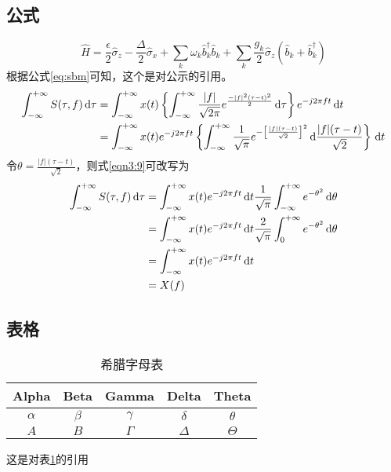 \subsection{公式}
\begin{equation}
\hat{H}=\frac{\epsilon}{2}\hat{\sigma}_{z}-\frac{\Delta}{2}\hat{\sigma}_{x}+\sum_{k}\omega_{k}\hat{b}_{k}^{\dagger}\hat{b}_{k}+\sum_{k}\frac{g_{k}}{2}\hat{\sigma}_{z}(\hat{b}_{k}+\hat{b}_{k}^{\dagger})\label{eq:sbm}
\end{equation}
根据公式\ref{eq:sbm}可知，这个是对公示的引用。
\begin{align}\label{eqn3:9}
\int_{-\infty}^{+\infty}S(\tau,f)\,\mathrm{d}\tau&=\int_{-\infty}^{+\infty}x(t)\left\{\int_{-\infty}^{+\infty}\frac{|f|}{\sqrt{2\pi}}e^{\frac{-|f|^2(\tau-t)^2}{2}}\,\mathrm{d}\tau\right\}e^{-j2\pi ft}\,\mathrm{d}t\notag\\
&=\int_{-\infty}^{+\infty}x(t)e^{-j2\pi ft}\left\{\int_{-\infty}^{+\infty}\frac{1}{\sqrt{\pi}}e^{-\left[\frac{|f|(\tau-t)}{\sqrt{2}}\right]^2}\,\mathrm{d}\frac{|f|(\tau-t)}{\sqrt{2}}\right\}\,\mathrm{d}t
\end{align}
令$\theta=\frac{|f|(\tau-t)}{\sqrt{2}}$，则式\eqref{eqn3:9}可改写为
\begin{align}\label{eqn3:10}
\int_{-\infty}^{+\infty}S(\tau,f)\,\mathrm{d}\tau&=\int_{-\infty}^{+\infty}x(t)e^{-j2\pi ft}\,\mathrm{d}t\frac{1}{\sqrt{\pi}}\int_{-\infty}^{+\infty}e^{-\theta^2}\,\mathrm{d}\theta\notag\\
&=\int_{-\infty}^{+\infty}x(t)e^{-j2\pi ft}\,\mathrm{d}t\frac{2}{\sqrt{\pi}}\int_{0}^{+\infty}e^{-\theta^2}\,\mathrm{d}\theta\notag\\
&=\int_{-\infty}^{+\infty}x(t)e^{-j2\pi ft}\,\mathrm{d}t\notag\\
&=X(f)
\end{align}
\subsection{表格}
\begin{table}[H]
	\begin{center}
		\caption{希腊字母表\label{tab:Greek}}
		\begin{tabular}{|c|c|c|c|c|}
			\hline
			Alpha & Beta & Gamma & Delta & Theta\\
			\hline
			$\alpha$ & $\beta$ & $\gamma$ & $\delta$ & $\theta$\\
			\hline
			$A$ & $B$ & $\Gamma$ & $\Delta$ & $\Theta$\\
			\hline
		\end{tabular}
		\end{center}
\end{table}
这是对表\ref{tab:Greek}的引用

